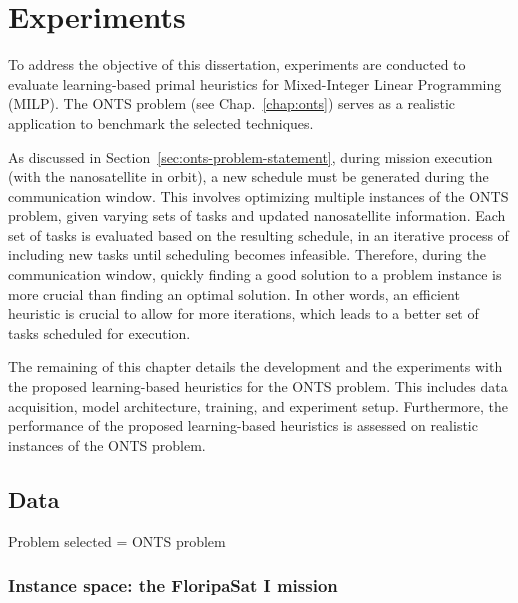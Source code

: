 

\chapter{Experiments}\label{chap:experiments}

To address the objective of this dissertation, experiments are conducted to evaluate learning-based primal heuristics for Mixed-Integer Linear Programming (MILP).
The ONTS problem (see Chap.~\ref{chap:onts}) serves as a realistic application to benchmark the selected techniques.

As discussed in Section~\ref{sec:onts-problem-statement}, during mission execution (with the nanosatellite in orbit), a new schedule must be generated during the communication window.
This involves optimizing multiple instances of the ONTS problem, given varying sets of tasks and updated nanosatellite information.
Each set of tasks is evaluated based on the resulting schedule, in an iterative process of including new tasks until scheduling becomes infeasible.
Therefore, during the communication window, quickly finding a good solution to a problem instance is more crucial than finding an optimal solution.
In other words, an efficient heuristic is crucial to allow for more iterations, which leads to a better set of tasks scheduled for execution.

The remaining of this chapter details the development and the experiments with the proposed learning-based heuristics for the ONTS problem.
This includes data acquisition, model architecture, training, and experiment setup.
Furthermore, the performance of the proposed learning-based heuristics is assessed on realistic instances of the ONTS problem.


\section{Data}

Problem selected = ONTS problem

\subsection{Instance space: the FloripaSat I mission}

